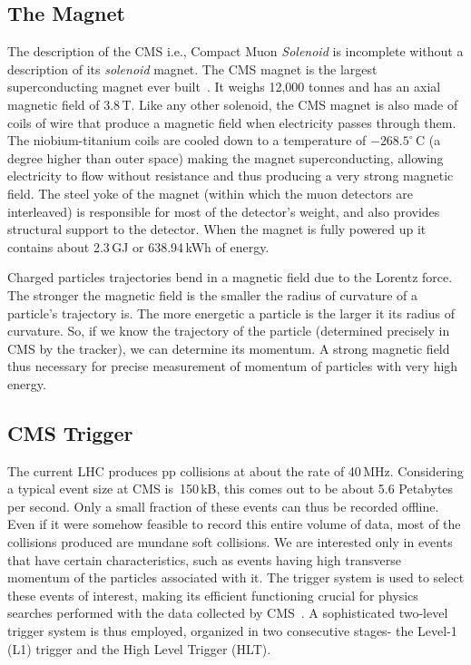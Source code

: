 \subsection{The Magnet}
\label{CMS magnet}
The description of the CMS i.e., Compact Muon \textit{Solenoid} is incomplete without a description of its \textit{solenoid} magnet. The CMS magnet is the largest superconducting magnet ever built~\cite{magnet}. It weighs 12,000 tonnes and has an axial magnetic field of 3.8\,T. Like any other solenoid, the CMS magnet is also made of coils of wire that produce a magnetic field when electricity passes through them. The niobium-titanium coils are cooled down to a temperature of $-268.5^{\circ}\,\mathrm{C}$ (a degree higher than outer space) making the magnet superconducting, allowing electricity to flow without resistance and thus producing a very strong magnetic field. The steel yoke of the magnet (within which the muon detectors are interleaved) is responsible for most of the detector's weight, and also provides structural support to the detector. When the magnet is fully powered up it contains about 2.3\,GJ or 638.94\,kWh of energy.

Charged particles trajectories bend in a magnetic field due to the Lorentz force. The stronger the magnetic field is the smaller the radius of curvature of a particle's trajectory is. The more energetic a particle is the larger it its radius of curvature. So, if we know the trajectory of the particle (determined precisely in CMS by the tracker), we can determine its momentum. A strong magnetic field thus necessary for precise measurement of momentum of particles with very high energy.


\subsection{CMS Trigger}
\label{trigger}

The current LHC produces pp collisions at about the rate of 40\,MHz. Considering a typical event size at CMS is~150\,kB, this comes out to be about 5.6 Petabytes per second. Only a small fraction of these events can thus be recorded offline. Even if it were somehow feasible to record this entire volume of data,  most of the collisions produced are mundane soft collisions. We are interested only in events that have certain characteristics, such as events having high transverse momentum of the particles associated with it. The trigger system is used to select these events of interest, making its efficient functioning crucial for physics searches performed with the data collected by CMS~\cite{trigger1}. A sophisticated two-level trigger system is thus employed, organized in two consecutive stages- the Level-1 (L1) trigger and the High Level Trigger (HLT).


